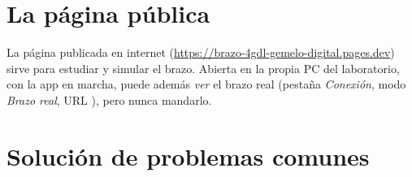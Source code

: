 \section{La página pública}
La página publicada en internet (\url{https://brazo-4gdl-gemelo-digital.pages.dev}) sirve para estudiar y simular el brazo. Abierta en la propia PC del laboratorio, con la app en marcha, puede además \emph{ver} el brazo real (pestaña \emph{Conexión}, modo \emph{Brazo real}, URL ), pero nunca mandarlo.

\section{Solución de problemas comunes}

